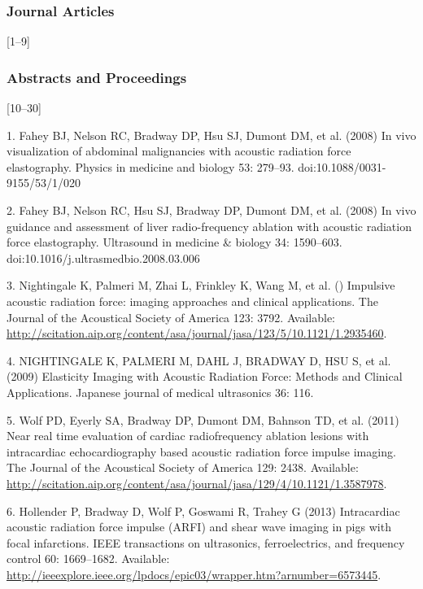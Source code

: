 \documentclass[]{article}
\begin{document}
\subsubsection{Journal Articles}

{[}1--9{]}

\subsubsection{Abstracts and Proceedings}

{[}10--30{]}

1. Fahey BJ, Nelson RC, Bradway DP, Hsu SJ, Dumont DM, et al. (2008) In
vivo visualization of abdominal malignancies with acoustic radiation
force elastography. Physics in medicine and biology 53: 279--93.
doi:10.1088/0031-9155/53/1/020

2. Fahey BJ, Nelson RC, Hsu SJ, Bradway DP, Dumont DM, et al. (2008) In
vivo guidance and assessment of liver radio-frequency ablation with
acoustic radiation force elastography. Ultrasound in medicine \& biology
34: 1590--603. doi:10.1016/j.ultrasmedbio.2008.03.006

3. Nightingale K, Palmeri M, Zhai L, Frinkley K, Wang M, et al. ()
Impulsive acoustic radiation force: imaging approaches and clinical
applications. The Journal of the Acoustical Society of America 123:
3792. Available:
\href{http://scitation.aip.org/content/asa/journal/jasa/123/5/10.1121/1.2935460}{http://scitation.aip.org/content/asa/journal/jasa/123/5/10.1121/1.2935460}.

4. NIGHTINGALE K, PALMERI M, DAHL J, BRADWAY D, HSU S, et al. (2009)
Elasticity Imaging with Acoustic Radiation Force: Methods and Clinical
Applications. Japanese journal of medical ultrasonics 36: 116.

5. Wolf PD, Eyerly SA, Bradway DP, Dumont DM, Bahnson TD, et al. (2011)
Near real time evaluation of cardiac radiofrequency ablation lesions
with intracardiac echocardiography based acoustic radiation force
impulse imaging. The Journal of the Acoustical Society of America 129:
2438. Available:
\href{http://scitation.aip.org/content/asa/journal/jasa/129/4/10.1121/1.3587978}{http://scitation.aip.org/content/asa/journal/jasa/129/4/10.1121/1.3587978}.

6. Hollender P, Bradway D, Wolf P, Goswami R, Trahey G (2013)
Intracardiac acoustic radiation force impulse (ARFI) and shear wave
imaging in pigs with focal infarctions. IEEE transactions on
ultrasonics, ferroelectrics, and frequency control 60: 1669--1682.
Available:
\href{http://ieeexplore.ieee.org/lpdocs/epic03/wrapper.htm?arnumber=6573445}{http://ieeexplore.ieee.org/lpdocs/epic03/wrapper.htm?arnumber=6573445}.
\end{document}
